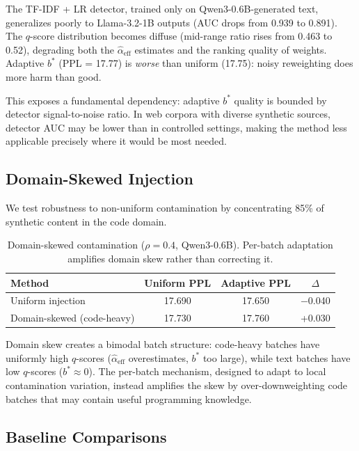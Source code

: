 \documentclass[11pt]{article}
\begin{document}
The TF-IDF + LR detector, trained only on Qwen3-0.6B-generated text, generalizes poorly to Llama-3.2-1B outputs (AUC drops from 0.939 to 0.891).
The $q$-score distribution becomes diffuse (mid-range ratio rises from 0.463 to 0.52), degrading both the $\hat{\alpha}_{\mathrm{eff}}$ estimates and the ranking quality of weights.
Adaptive $b^*$ (PPL = 17.77) is \emph{worse} than uniform (17.75): noisy reweighting does more harm than good.

This exposes a fundamental dependency: adaptive $b^*$ quality is bounded by detector signal-to-noise ratio.
In web corpora with diverse synthetic sources, detector AUC may be lower than in controlled settings, making the method less applicable precisely where it would be most needed.

\subsection{Domain-Skewed Injection}
\label{sec:domain_skew}

We test robustness to non-uniform contamination by concentrating 85\% of synthetic content in the code domain.

\begin{table}[t]
\centering
\caption{Domain-skewed contamination ($\rho = 0.4$, Qwen3-0.6B). Per-batch adaptation amplifies domain skew rather than correcting it.}
\label{tab:domain_skew}
\small
\begin{tabular}{lccc}
\toprule
Method & Uniform PPL & Adaptive PPL & $\Delta$ \\
\midrule
Uniform injection & 17.690 & 17.650 & $-$0.040 \\
Domain-skewed (code-heavy) & 17.730 & 17.760 & +0.030 \\
\bottomrule
\end{tabular}
\end{table}

Domain skew creates a bimodal batch structure: code-heavy batches have uniformly high $q$-scores ($\hat{\alpha}_{\mathrm{eff}}$ overestimates, $b^*$ too large), while text batches have low $q$-scores ($b^* \approx 0$).
The per-batch mechanism, designed to adapt to local contamination variation, instead amplifies the skew by over-downweighting code batches that may contain useful programming knowledge.

\subsection{Baseline Comparisons}
\label{sec:baselines}
\end{document}
